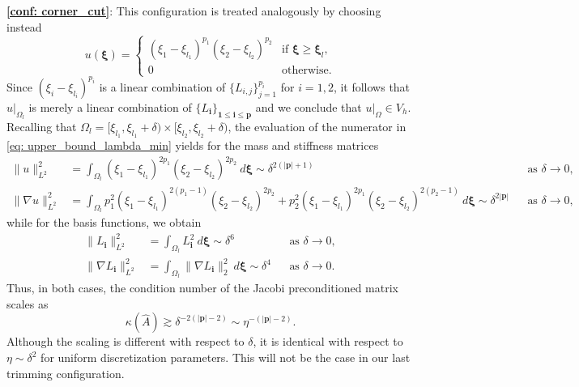 \documentclass{article}
\numberwithin{equation}{section}
\newcommand{\dbxi}{d\bm{\xi}}
\newcommand{\restr}[2]{\left.{#1}\right|_{#2}}
\theoremstyle{definition}
\begin{document}
\noindent \textbf{\ref{conf: corner_cut}}: This configuration is treated analogously by choosing instead
\begin{equation*}
    u(\bm{\xi}) =
    \begin{cases}
        (\xi_1-\xi_{l_1})^{p_1}(\xi_2-\xi_{l_2})^{p_2} & \text{if } \bm{\xi} \geq \bm{\xi}_{l}, \\
        0 & \text{otherwise}.
    \end{cases}
\end{equation*}
Since $(\xi_i-\xi_{l_i})^{p_i}$ is a linear combination of $\{L_{i,j}\}_{j=1}^{p_i}$ for $i=1,2$, it follows that $\restr{u}{\Omega_l}$ is merely a linear combination of $\{L_{\bm{i}}\}_{\bm{1} \leq \bm{i} \leq \bm{p}}$ and we conclude that $\restr{u}{\Omega} \in V_h$. Recalling that $\Omega_l = [\xi_{l_1},\xi_{l_1}+\delta) \times [\xi_{l_2},\xi_{l_2}+\delta)$, the evaluation of the numerator in \eqref{eq: upper_bound_lambda_min} yields for the mass and stiffness matrices
\begin{align*}
    \|u\|_{L^2}^2 &= \int_{\Omega_l} (\xi_1-\xi_{l_1})^{2p_1}(\xi_2-\xi_{l_2})^{2p_2} \ \dbxi \sim \delta^{2(|\bm{p}|+1)} & &\text{as } \delta \to 0, \\
    \|\nabla u\|_{L^2}^2 &= \int_{\Omega_l} p_1^2(\xi_1-\xi_{l_1})^{2(p_1-1)}(\xi_2-\xi_{l_2})^{2p_2} + p_2^2(\xi_1-\xi_{l_1})^{2p_1}(\xi_2-\xi_{l_2})^{2(p_2-1)} \ \dbxi \sim \delta^{2|\bm{p}|} & &\text{as } \delta \to 0,
\end{align*}
while for the basis functions, we obtain
\begin{align*}
    \|L_{\bm{i}}\|_{L^2}^2 &= \int_{\Omega_l} L_{\bm{i}}^2 \ \dbxi \sim \delta^6 & &\text{as } \delta \to 0, \\
    \|\nabla L_{\bm{i}}\|_{L^2}^2 &= \int_{\Omega_l} \|\nabla L_{\bm{i}}\|_2^2 \ \dbxi \sim \delta^4 & &\text{as } \delta \to 0.
\end{align*}
Thus, in both cases, the condition number of the Jacobi preconditioned matrix scales as
\begin{equation*}
    \kappa(\hat{A}) \gtrsim \delta^{-2(|\bm{p}|-2)} \sim \eta^{-(|\bm{p}|-2)}.
\end{equation*}
Although the scaling is different with respect to $\delta$, it is identical with respect to $\eta \sim \delta^2$ for uniform discretization parameters. This will not be the case in our last trimming configuration. \\
\end{document}
